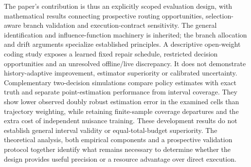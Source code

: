 The paper's contribution is thus an explicitly scoped evaluation design, with mathematical results connecting
prospective routing opportunities, selection-aware branch validation and execution-contract sensitivity.
The general identification and influence-function machinery is inherited; the branch allocation and drift
arguments specialize established principles. A descriptive open-weight coding study exposes a learned fixed
repair schedule, restricted decision opportunities and an unresolved offline/live discrepancy. It does not
demonstrate history-adaptive improvement, estimator superiority or calibrated uncertainty. Complementary two-decision simulations compare policy estimates with exact truth and separate point-estimation
performance from interval coverage. They show lower observed doubly robust estimation error in the examined
cells than trajectory weighting, while retaining finite-sample coverage departures and the extra cost of independent nuisance training.
These development results do not establish general interval validity or equal-total-budget superiority.
The theoretical analysis, both empirical components and a prospective validation protocol together identify
what remains necessary to determine whether the design provides useful precision or a resource advantage
over direct execution.
